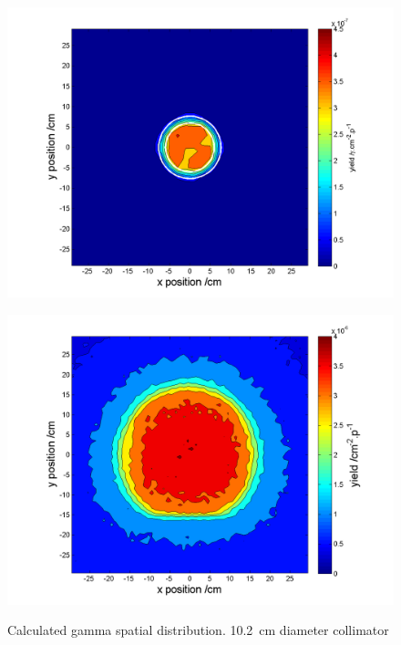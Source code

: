 \documentclass[11pt,a4paper]{IEEEtran}
\let\MYoriglatexcaption\caption
\renewcommand{\caption}[2][\relax]{\MYoriglatexcaption[#2]{#2}}
\begin{document}
\begin{figure}[t]
    \begin{minipage}{\columnwidth}
        \includegraphics[width=\columnwidth]{SUP10ColSpatialDistributionAllG.png}
        \label{fig:GammaSpatialDistributionSUP}
    \end{minipage}
    \begin{minipage}{\columnwidth}
        \includegraphics[width=\columnwidth]{CUP10ColSpatialDistributionAllG.png}
        \label{fig:GammaSpatialDistributionCUP}
    \end{minipage}
    \caption{
        Calculated gamma spatial distribution.
        \SI{10.2}{\cm} diameter collimator
    }
    \label{fig:GammaSpatialDistribution}
\end{figure}
\end{document}
